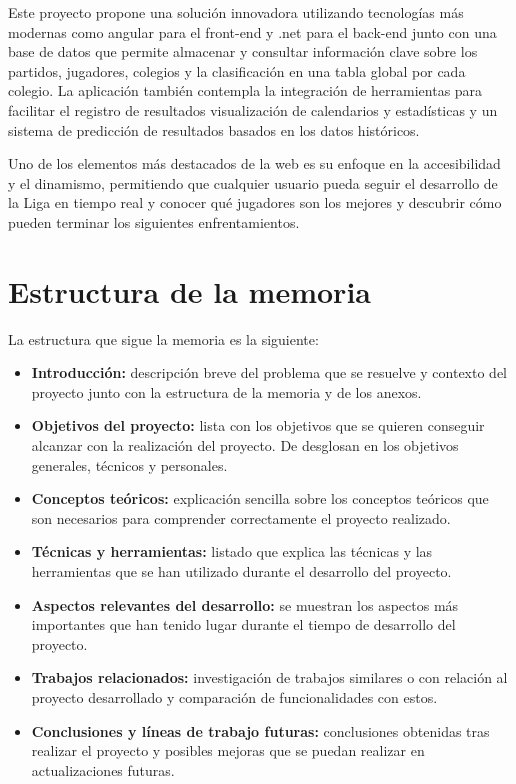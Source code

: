 
Este proyecto propone una solución innovadora utilizando tecnologías más modernas como angular para el front-end y .net para el back-end junto con una base de datos que permite almacenar y consultar información clave sobre los partidos, jugadores, colegios y la clasificación en una tabla global por cada colegio. La aplicación también contempla la integración de herramientas para facilitar el registro de resultados visualización de calendarios y estadísticas y un sistema de predicción de resultados basados en los datos históricos.

Uno de los elementos más destacados de la web es su enfoque en la accesibilidad y el dinamismo, permitiendo que cualquier usuario pueda seguir el desarrollo de la Liga en tiempo real y conocer qué jugadores son los mejores y descubrir cómo pueden terminar los siguientes enfrentamientos.

\section{Estructura de la memoria}\label{estructura-de-la-memoria}

La estructura que sigue la memoria es la siguiente:

\begin{itemize}
\tightlist
\item
  \textbf{Introducción:} descripción breve del problema que se resuelve y contexto del proyecto junto con la estructura de la memoria y de los anexos.
\item
  \textbf{Objetivos del proyecto:} lista con los objetivos que se quieren conseguir alcanzar con la realización del proyecto. De desglosan en los objetivos generales, técnicos y personales.
\item
  \textbf{Conceptos teóricos:} explicación sencilla sobre los conceptos teóricos que son necesarios para comprender correctamente el proyecto realizado.
\item
  \textbf{Técnicas y herramientas:} listado que explica las técnicas y las herramientas que se han utilizado durante el desarrollo del proyecto.
\item
  \textbf{Aspectos relevantes del desarrollo:} se muestran los aspectos más importantes que han tenido lugar durante el tiempo de desarrollo del proyecto.
\item
  \textbf{Trabajos relacionados:} investigación de trabajos similares o con relación al proyecto desarrollado y comparación de funcionalidades con estos.
\item
  \textbf{Conclusiones y líneas de trabajo futuras:} conclusiones obtenidas tras realizar el proyecto y posibles mejoras que se puedan realizar en actualizaciones futuras.
\end{itemize}



